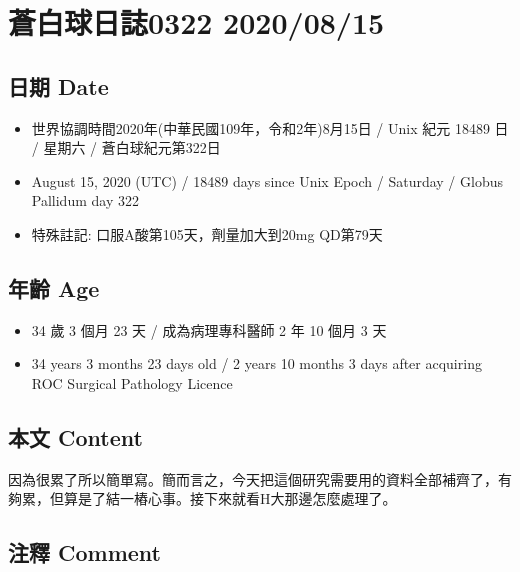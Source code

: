 \documentclass[
]{article}
\providecommand{\tightlist}{%
  \setlength{\itemsep}{0pt}\setlength{\parskip}{0pt}}
\begin{document}
\hypertarget{ux84bcux767dux7403ux65e5ux8a8c0322-20200815}{%
\section{蒼白球日誌0322
2020/08/15}\label{ux84bcux767dux7403ux65e5ux8a8c0322-20200815}}

\hypertarget{ux65e5ux671f-date-14}{%
\subsection{日期 Date}\label{ux65e5ux671f-date-14}}

\begin{itemize}
\tightlist
\item
  世界協調時間2020年(中華民國109年，令和2年)8月15日 / Unix 紀元 18489 日
  / 星期六 / 蒼白球紀元第322日
\item
  August 15, 2020 (UTC) / 18489 days since Unix Epoch / Saturday /
  Globus Pallidum day 322
\item
  特殊註記: 口服A酸第105天，劑量加大到20mg QD第79天
\end{itemize}

\hypertarget{ux5e74ux9f61-age-14}{%
\subsection{年齡 Age}\label{ux5e74ux9f61-age-14}}

\begin{itemize}
\tightlist
\item
  34 歲 3 個月 23 天 / 成為病理專科醫師 2 年 10 個月 3 天
\item
  34 years 3 months 23 days old / 2 years 10 months 3 days after
  acquiring ROC Surgical Pathology Licence
\end{itemize}

\hypertarget{ux672cux6587-content-14}{%
\subsection{本文 Content}\label{ux672cux6587-content-14}}

因為很累了所以簡單寫。簡而言之，今天把這個研究需要用的資料全部補齊了，有夠累，但算是了結一樁心事。接下來就看H大那邊怎麼處理了。

\hypertarget{ux6ce8ux91cb-comment-14}{%
\subsection{注釋 Comment}\label{ux6ce8ux91cb-comment-14}}
\end{document}
